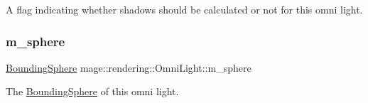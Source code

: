 A flag indicating whether shadows should be calculated or not for this omni light. \hypertarget{classmage_1_1rendering_1_1_omni_light_af11a99e2b1500093b9bd0e3ff16b04e6}{}\label{classmage_1_1rendering_1_1_omni_light_af11a99e2b1500093b9bd0e3ff16b04e6} 
\subsubsection{\texorpdfstring{m\+\_\+sphere}{m\_sphere}}
{\footnotesize\ttfamily \hyperlink{classmage_1_1_bounding_sphere}{Bounding\+Sphere} mage\+::rendering\+::\+Omni\+Light\+::m\+\_\+sphere\hspace{0.3cm}{\ttfamily [private]}}

The \hyperlink{classmage_1_1_bounding_sphere}{Bounding\+Sphere} of this omni light. 